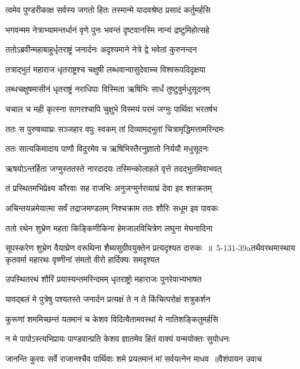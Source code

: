\twolineshloka
{त्वमेव पुण्डरीकाक्ष सर्वस्य जगतो हितः}
{तस्मान्मे यादवश्रेष्ठ प्रसादं कर्तुमर्हसि}


\twolineshloka
{भगवन्मम नेत्राभ्यामन्तर्धानं वृणे पुनः}
{भवन्तं दृष्टवानस्मि नान्यं द्रष्टुमिहोत्सहे}


\twolineshloka
{ततोऽब्रवीन्महाबाहुर्धृतराष्ट्रं जनार्दनः}
{अदृश्यमाने नेत्रे द्वे भवेतां कुरुनन्दन}


\twolineshloka
{तत्राद्भुतं महाराज धृतराष्ट्रश्च चक्षुषी}
{लब्धवान्वासुदेवाच्च विश्वरूपदिदृक्षया}


\twolineshloka
{लब्धचक्षुषमासीनं धृतराष्ट्रं नराधिपाः}
{विस्मिता ऋषिभिः सार्धं तुष्टुवुर्मधुसूदनम्}


\twolineshloka
{चचाल च मही कृत्स्ना सागरश्चापि चुक्षुभे}
{विस्मयं परमं जग्मुः पार्थिवा भरतर्षभ}


\twolineshloka
{ततः स पुरुषव्याघ्रः सञ्जहार वपुः स्वकम्}
{तां दिव्यामद्भुतां चित्रामृद्धिमत्तामरिन्दमः}


\twolineshloka
{ततः सात्यकिमादाय पाणौ विदुरमेव च}
{ऋषिभिस्तैरनुज्ञातो निर्ययौ मधुसूदनः}


\twolineshloka
{ऋषयोऽन्तर्हिता जग्मुस्ततस्ते नारदादयः}
{तस्मिन्कोलाहले वृत्ते तदद्भुतमिवाभवत्}


\twolineshloka
{तं प्रस्थितमभिप्रेक्ष्य कौरवाः सह राजभिः}
{अनुजग्मुर्नरव्याघ्रं देवा इव शतक्रतम्}


\twolineshloka
{अचिन्तयन्नमेयात्मा सर्वं तद्राजमण्डलम्}
{निश्चक्राम ततः शौरिः सधूम इव पावकः}


\twolineshloka
{ततो रथेन शुभ्रेण महता किङ्किणीकिना}
{हेमजालविचित्रेण लघुना मेघनादिना}


\threelineshloka
{सूपस्करेण शुभ्रेण वैयाघ्रेण वरूथिना}
{शैब्यसुग्रीवयुक्तेन प्रत्यदृश्यत दारुकः ॥ 5-131-39aतथैवरथमास्थाय कृतवर्मा महारथः}
{वृष्णीनां संमतो वीरो हार्दिक्यः समदृश्यत}


\twolineshloka
{उपस्थितरथं शौरिं प्रयास्यन्तमरिन्दमम्}
{धृतराष्ट्रो महाराजः पुनरेवाभ्यभाषत}


\twolineshloka
{यावद्बलं मे पुत्रेषु पश्यतस्ते जनार्दन}
{प्रत्यक्षं ते न ते किंचित्परोक्षं शत्रुकर्शन}


\twolineshloka
{कुरूणां शममिच्छन्तं यतमानं च केशव}
{विदित्वैतामवस्थां मे नातिशङ्कितुमर्हसि}


\twolineshloka
{न मे पापोऽस्त्यभिप्रायः पाण्डवान्प्रति केशव}
{ज्ञातमेव हितं वाक्यं यन्मयोक्तः सुयोधनः}


\threelineshloka
{जानन्ति कुरवः सर्वे राजानश्चैव पार्थिवाः}
{शमे प्रयतमानं मां सर्वयत्नेन माधव ॥वैशंपायन उवाच}
{}


